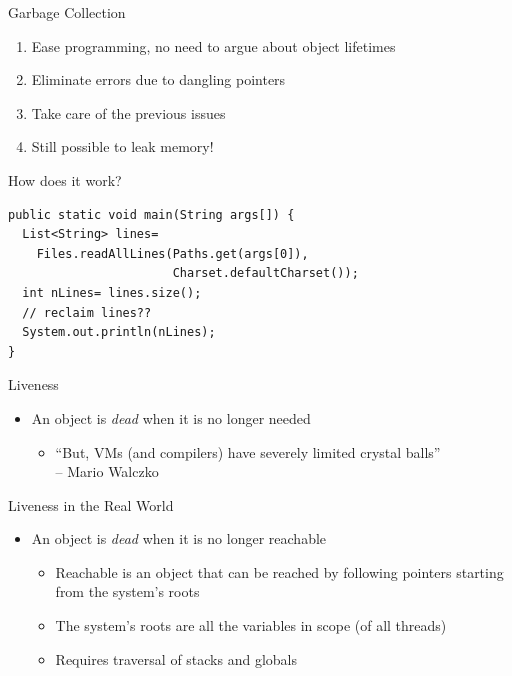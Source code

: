 \documentclass[
14pt,
aspectratio=169,
usenames,
dvipsnames,
x11names]{beamer}
\begin{document}
\begin{frame}{Garbage Collection}
  \begin{enumerate}  \setlength{\itemsep}{\fill}
  \item Ease programming, no need to argue about object lifetimes
  \item Eliminate errors due to dangling pointers
  \item Take care of the previous issues
  \item Still possible to leak memory!
  \end{enumerate}
\end{frame}

\begin{frame}[fragile]{How does it work?}
\begin{lstlisting}
public static void main(String args[]) {
  List<String> lines=
    Files.readAllLines(Paths.get(args[0]),
                       Charset.defaultCharset());
  int nLines= lines.size();
  // reclaim lines??
  System.out.println(nLines);
}
\end{lstlisting}
\end{frame}

\begin{frame}{Liveness}
  \begin{itemize}
  \item An object is \textit{dead} when it is \alert{no longer needed}
    \pause
    \begin{itemize}
    \item ``But, VMs (and compilers) have severely limited crystal balls''\\
      \hfill -- Mario Walczko
    \end{itemize}
  \end{itemize}
\end{frame}

\begin{frame}{Liveness in the Real World}
  \begin{itemize}
  \item An object is \textit{dead} when it is \alert{no longer reachable}
    \begin{itemize}  \setlength{\itemsep}{\fill}
    \item Reachable is an object that can be reached by following pointers starting from the system's roots
    \item The system's roots are all the variables in scope (of all threads)
    \item Requires traversal of stacks and globals
    \end{itemize}
  \end{itemize}
\end{frame}
\end{document}
